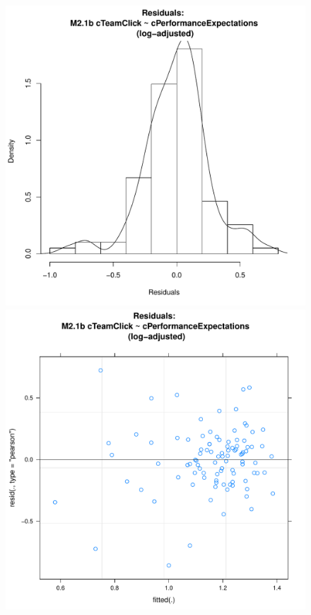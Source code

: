 \documentclass[12pt]{report}
\begin{document}
{\begin{figure}[htbp]
  \includegraphics[scale =.4]{../images/MLM21bLogHist.pdf}
  \includegraphics[scale =.4]{../images/MLM21bLogScatter.pdf}

\end{figure}}
\end{document}
